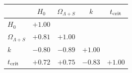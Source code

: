 \begin{tabular}{lcccc}
\toprule
 & $H_0$ & $\Omega_{\Lambda+S}$ & $k$ & $t_{\rm crit}$ \\
\midrule
$H_0$ & $+1.00$ &  &  &  \\
$\Omega_{\Lambda+S}$ & $+0.81$ & $+1.00$ &  &  \\
$k$ & $-0.80$ & $-0.89$ & $+1.00$ &  \\
$t_{\rm crit}$ & $+0.72$ & $+0.75$ & $-0.83$ & $+1.00$ \\
\bottomrule
\end{tabular}
